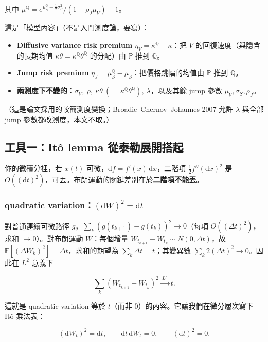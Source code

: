 \documentclass[12pt, a4paper]{article}
\theoremstyle{remark}
\newcommand{\E}{\mathbb{E}}
\newcommand{\Q}{\mathbb{Q}}
\newcommand{\Pp}{\mathbb{P}}
\newcommand{\dd}{\mathrm{d}}
\begin{document}
其中 $\bar\mu^\Q = e^{\mu_S^\Q+\frac12\sigma_S^2}/(1-\rho_J\mu_V)-1$。

\begin{keybox}[title={P $\to$ Q 對哪些參數動手}]
這是「模型內容」（不是入門測度論，要寫）：
\begin{itemize}[topsep=2pt, itemsep=1pt]
  \item \textbf{Diffusive variance risk premium} $\eta_V = \kappa^\Q-\kappa$：把 $V$ 的回復速度（與隱含的長期均值 $\kappa\theta=\kappa^\Q\theta^\Q$ 的分配）由 $\Pp$ 推到 $\Q$。
  \item \textbf{Jump risk premium} $\eta_J = \mu_S^\Q-\mu_S$：把價格跳幅的均值由 $\Pp$ 推到 $\Q$。
  \item \textbf{兩測度下不變的}：$\sigma_V,\ \rho,\ \kappa\theta\ (=\kappa^\Q\theta^\Q),\ \lambda$，以及其餘 jump 參數 $\mu_V,\sigma_S,\rho_J$。
\end{itemize}
（這是論文採用的較簡測度變換；Broadie--Chernov--Johannes 2007 允許 $\lambda$ 與全部 jump 參數都改測度，本文不取。）
\end{keybox}

\subsection{工具一：Itô lemma 從泰勒展開搭起}

你的微積分裡，若 $x(t)$ 可微，$\dd f = f'(x)\,\dd x$，二階項 $\frac12 f''(\dd x)^2$ 是 $O((\dd t)^2)$，可丟。布朗運動的關鍵差別在於\textbf{二階項不能丟}。

\subsubsection*{quadratic variation：$(\dd W)^2=\dd t$}

對普通連續可微路徑 $g$，$\sum_k(g(t_{k+1})-g(t_k))^2\to 0$（每項 $O((\Delta t)^2)$，求和 $\to 0$）。對布朗運動 $W$：每個增量 $W_{t_{k+1}}-W_{t_k}\sim N(0,\Delta t)$，故 $\E[(\Delta W_k)^2]=\Delta t$，求和的期望為 $\sum_k\Delta t = t$；其變異數 $\sum_k 2(\Delta t)^2\to 0$。因此在 $L^2$ 意義下

\[
  \sum_k(W_{t_{k+1}}-W_{t_k})^2 \xrightarrow{\ L^2\ } t.
\]

這就是 quadratic variation 等於 $t$（而非 $0$）的內容。它讓我們在微分層次寫下 Itô 乘法表：

\begin{equation}
  (\dd W_t)^2 = \dd t,\qquad \dd t\,\dd W_t = 0,\qquad (\dd t)^2 = 0.
  \tag{$\star$1}\label{eq:ito-rules}
\end{equation}
\end{document}
